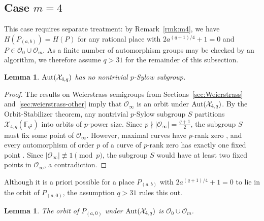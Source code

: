 \documentclass[12pt]{amsart}
\newtheorem{lemma}[theorem]{Lemma}
\theoremstyle{remark}
\theoremstyle{definition}
\def\Aut{{\rm Aut}}
\begin{document}
\subsection{\texorpdfstring{Case $m = 4$}{Case m = 4}}

This case requires separate treatment: by Remark~\ref{rmk:m4}, we have 
$H(P_{(a,b)}) = H(P)$ for any rational place with $2a^{(q+1)/4} + 1 = 0$ 
and $P \in \mathcal{O}_0 \cup \mathcal{O}_m$. As a finite number of automorphism groups may be checked by an algorithm, we therefore assume $q > 31$ for the 
remainder of this subsection.

\begin{lemma}\label{sylow4}
    $\Aut(\mathcal{X}_{4,q})$ has no nontrivial $p$-Sylow subgroup.
\end{lemma}

\begin{proof}
    The results on Weierstrass semigroups from 
    Sections~\ref{sec:Weierstrass} and~\ref{sec:weierstrass-other} imply 
    that $\mathcal{O}_\infty$ is an orbit under $\Aut(\mathcal{X}_{4,q})$. 
    By the Orbit-Stabilizer theorem, any nontrivial $p$-Sylow subgroup $S$ partitions 
    $\mathcal{X}_{4,q}(\mathbb{F}_{q^2})$ into orbits of $p$-power size. 
    Since $p \nmid |\mathcal{O}_\infty| = \frac{q+1}{2}$, the subgroup $S$ 
    must fix some point of $\mathcal{O}_\infty$. However, maximal curves 
    have $p$-rank zero \cite[Theorem~10.1]{HKT}, and every automorphism of 
    order $p$ of a curve of $p$-rank zero has exactly one fixed point 
    \cite[Lemma~11.129]{HKT}. Since $|\mathcal{O}_\infty| \not\equiv 1 
    \pmod{p}$, the subgroup $S$ would have at least two fixed points in 
    $\mathcal{O}_\infty$, a contradiction.
\end{proof}

Although it is a priori possible for a place $P_{(a,b)}$ with 
$2a^{(q+1)/4} + 1 = 0$ to lie in the orbit of $P_{(a,0)}$, the assumption 
$q > 31$ rules this out.

\begin{lemma}\label{lem:orbit-Om}
    The orbit of $P_{(a,0)}$ under $\Aut(\mathcal{X}_{4,q})$ is 
    $\mathcal{O}_0 \cup \mathcal{O}_m$.
\end{lemma}
\end{document}
